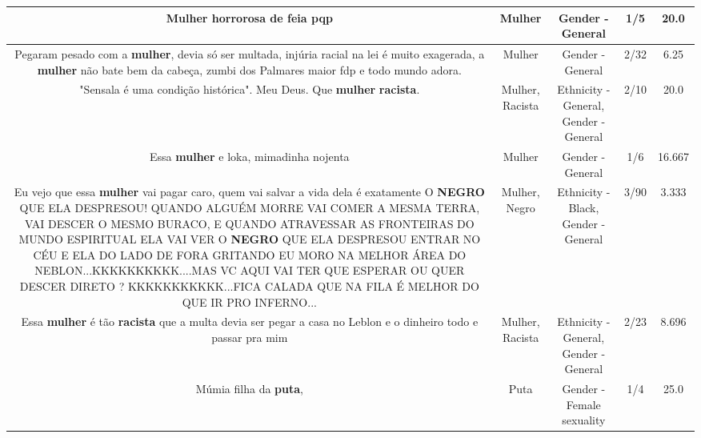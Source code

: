 \documentclass[11pt]{article}
\newlength\mylength
\begin{document}
\begin{center}
\begin{longtable}{|C{.65\mylength}|C{.30\mylength}|C{.12\mylength}|C{.12\mylength}|C{.12\mylength}|}
  \small Mulher horrorosa de feia pqp\normalsize   & Mulher & Gender - General & 1/5 & 20.0 \\  \hline
  \small Pegaram pesado com a \textbf{mulher}, devia só ser multada, injúria racial na lei é muito exagerada, a \textbf{mulher} não bate bem da cabeça, zumbi dos Palmares maior fdp e todo mundo adora.\normalsize   & Mulher & Gender - General & 2/32 & 6.25 \\  \hline
  \small "Sensala é uma condição histórica". Meu Deus. Que \textbf{mulher} \textbf{racista}.\normalsize   & Mulher, Racista & Ethnicity - General, Gender - General & 2/10 & 20.0 \\  \hline
  \small Essa \textbf{mulher} e loka, mimadinha nojenta\normalsize   & Mulher & Gender - General & 1/6 & 16.667 \\  \hline
  \small Eu vejo que essa \textbf{mulher} vai pagar caro, quem vai salvar a vida dela é exatamente O \textbf{NEGRO} QUE ELA DESPRESOU! QUANDO ALGUÉM MORRE VAI COMER A MESMA TERRA, VAI DESCER O MESMO BURACO, E QUANDO ATRAVESSAR AS FRONTEIRAS DO MUNDO ESPIRITUAL ELA VAI VER O \textbf{NEGRO} QUE ELA DESPRESOU ENTRAR NO CÉU E ELA DO LADO DE FORA GRITANDO EU MORO NA MELHOR ÁREA DO NEBLON...KKKKKKKKKK....MAS VC AQUI VAI TER QUE ESPERAR OU QUER DESCER DIRETO ? KKKKKKKKKKK...FICA CALADA QUE NA FILA É MELHOR DO QUE IR PRO INFERNO...\normalsize   & Mulher, Negro & Ethnicity - Black, Gender - General & 3/90 & 3.333 \\  \hline
  \small Essa \textbf{mulher} é tão \textbf{racista} que a multa devia ser pegar a casa no Leblon e o dinheiro todo e passar pra mim\normalsize   & Mulher, Racista & Ethnicity - General, Gender - General & 2/23 & 8.696 \\  \hline
  \small Múmia filha da \textbf{puta},\normalsize   & Puta & Gender - Female sexuality & 1/4 & 25.0 \\  \hline

\end{longtable}
\end{center}
\end{document}
